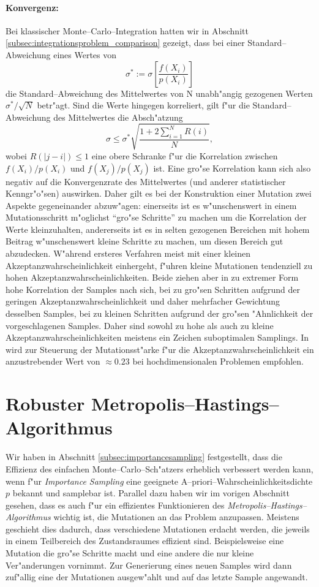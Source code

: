 	\paragraph{Konvergenz:}Bei klassischer Monte--Carlo--Integration hatten wir in Abschnitt \ref{subsec:integrationsproblem_comparison} gezeigt, dass bei einer Standard--Abweichung eines Wertes von $$\sigma^*:=\sigma\left[\frac{f(X_i)}{p(X_i)}\right]$$ die Standard--Abweichung des Mittelwertes von N unabh"angig gezogenen Werten $\sigma^*/\sqrt{N}$ betr"agt. Sind die Werte hingegen korreliert, gilt f"ur die Standard--Abweichung des Mittelwertes die Absch"atzung \citep[siehe][VII.\;\S3(8)]{Renyi:1964p10655}
	$$\sigma\leq \sigma^*\sqrt{\frac{1+2\sum_{i=1}^N R(i)}{N}},$$
	wobei $R(|j-i|)\leq 1$ eine obere Schranke f"ur die Korrelation zwischen $f(X_i)/p(X_i)$ und $f(X_j)/p(X_j)$ ist.
	Eine gro"se Korrelation kann sich also negativ auf die Konvergenzrate des Mittelwertes (und anderer statistischer Kenngr"o"sen) auswirken. Daher gilt es bei der Konstruktion einer Mutation zwei Aspekte gegeneinander abzuw"agen: einerseits ist es w"unschenswert in einem Mutationsschritt m"oglichst ``gro"se Schritte'' zu machen um die Korrelation der Werte kleinzuhalten, andererseits ist es in selten gezogenen Bereichen mit hohem Beitrag w"unschenswert kleine Schritte zu machen, um diesen Bereich gut abzudecken. W"ahrend ersteres Verfahren meist mit einer kleinen Akzeptanzwahrscheinlichkeit einhergeht, f"uhren kleine Mutationen tendenziell zu hohen Akzeptanzwahrscheinlichkeiten. Beide ziehen aber in zu extremer Form hohe Korrelation der Samples nach sich, bei zu gro"sen Schritten aufgrund der geringen Akzeptanzwahrscheinlichkeit und daher mehrfacher Gewichtung desselben Samples, bei zu kleinen Schritten aufgrund der gro"sen "Ahnlichkeit der vorgeschlagenen Samples. Daher sind sowohl zu hohe als auch zu kleine Akzeptanzwahrscheinlichkeiten meistens ein Zeichen suboptimalen Samplings. In \citep{Roberts:1997p5198} wird zur Steuerung der Mutationsst"arke f"ur die Akzeptanzwahrscheinlichkeit ein anzustrebender Wert von $\approx 0.23$ bei hochdimensionalen Problemen empfohlen.

	
	
	\section{Robuster Metropolis--Hastings--Algorithmus}
	Wir haben in Abschnitt \ref{subsec:importancesampling} festgestellt, dass die Effizienz des einfachen Monte--Carlo--Sch"atzers erheblich verbessert werden kann, wenn f"ur {\em Importance Sampling} eine geeignete A--priori--Wahrscheinlichkeitsdichte $p$ bekannt und samplebar ist. Parallel dazu haben wir im vorigen Abschnitt gesehen, dass es auch f"ur ein effizientes Funktionieren des {\em Metropolis--Hastings--Algorithmus} wichtig ist, die Mutationen an das Problem anzupassen. Meistens geschieht dies dadurch, dass verschiedene Mutationen erdacht werden, die jeweils in einem Teilbereich des Zustandsraumes effizient sind. Beispielsweise eine Mutation die gro"se Schritte macht und eine andere die nur kleine Ver"anderungen vornimmt. Zur Generierung eines neuen Samples wird dann zuf"allig eine der Mutationen ausgew"ahlt und auf das letzte Sample angewandt.
	

